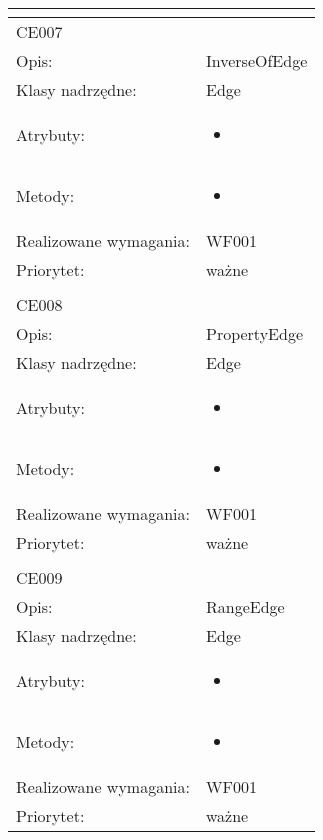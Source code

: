 \documentclass[a4paper,10pt]{article}
\begin{document}
\begin{center}
\begin{longtable}{|m{3cm}|m{9cm}|}
\multicolumn{2}{c}{} \\
 \hline

CE007 &  \\ \hline
Opis: & InverseOfEdge    \\ \hline
Klasy nadrzędne: & Edge    \\ \hline
Atrybuty: & \begin{itemize}
 \item 
\end{itemize}
 \\ \hline
Metody: & \begin{itemize}
 \item 
\end{itemize}
  \\ \hline
Realizowane wymagania: & WF001 \\ \hline
Priorytet: & ważne  \\ \hline

\multicolumn{2}{c}{} \\
 \hline

CE008 &  \\ \hline
Opis: & PropertyEdge    \\ \hline
Klasy nadrzędne: & Edge    \\ \hline
Atrybuty: & \begin{itemize}
 \item 
\end{itemize}
 \\ \hline
Metody: & \begin{itemize}
 \item 
\end{itemize}
  \\ \hline
Realizowane wymagania: & WF001 \\ \hline
Priorytet: & ważne  \\ \hline

\multicolumn{2}{c}{} \\
 \hline

CE009 &  \\ \hline
Opis: & RangeEdge    \\ \hline
Klasy nadrzędne: & Edge    \\ \hline
Atrybuty: & \begin{itemize}
 \item 
\end{itemize}
 \\ \hline
Metody: & \begin{itemize}
 \item 
\end{itemize}
  \\ \hline
Realizowane wymagania: & WF001 \\ \hline
Priorytet: & ważne  \\ \hline


\end{longtable}
\end{center}
\end{document}
